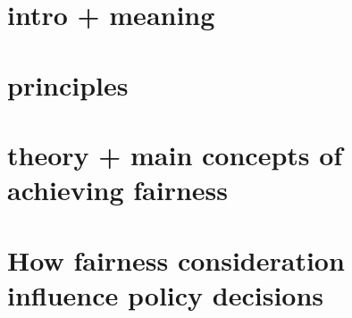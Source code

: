 \section{intro + meaning}
\section{principles}
\section{theory + main concepts of achieving fairness}
\section{How fairness consideration influence policy decisions}